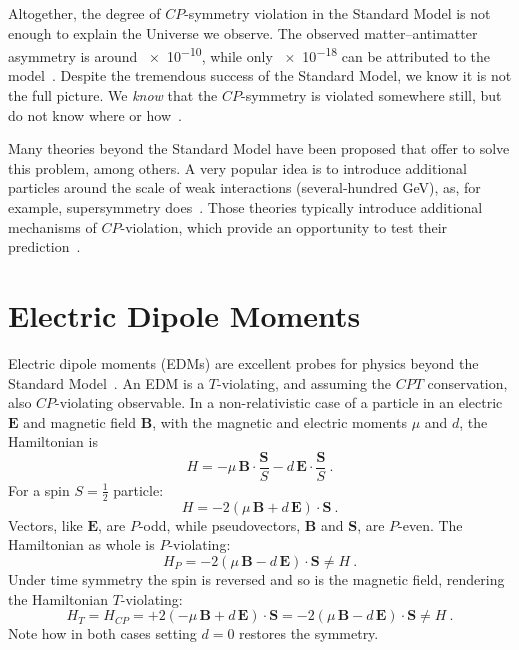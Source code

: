 Altogether, the degree of $CP$-symmetry violation in the Standard Model is not enough to explain the Universe we observe. The observed matter--antimatter asymmetry is around \num{e-10}, while only \num{e-18} can be attributed to the model~\cite{Riotto1999}. Despite the tremendous success of the Standard Model, we know it is not the full picture. We \emph{know} that the $CP$-symmetry is violated somewhere still, but do not know where or how~\cite{Pospelov2005}.%

Many theories beyond the Standard Model have been proposed that offer to solve this problem, among others. A very popular idea is to introduce additional particles around the scale of weak interactions (several-hundred GeV), as, for example, supersymmetry does~\cite{Supersymmetry}. Those theories typically introduce additional mechanisms of $CP$-violation, which provide an opportunity to test their prediction~\cite{Ellis1989}.



\section{Electric Dipole Moments}
Electric dipole moments (EDMs) are excellent probes for physics beyond the Standard Model~\cite{Pospelov2005}. An EDM is a $T$-violating, and assuming the $CPT$ conservation, also $CP$-violating observable. In a non-relativistic case of a particle in an electric $\mathbf{E}$ and magnetic field $\mathbf{B}$, with the magnetic and electric moments $\mu$ and $d$, the Hamiltonian is
\begin{equation}
  H = - \mu \, \mathbf{B} \cdot \frac{\mathbf{S}}{S} - d \, \mathbf{E} \cdot \frac{\mathbf{S}}{S} \ .
\end{equation}
For a spin $S = \tfrac{1}{2}$ particle:
\begin{equation}
  H = - 2 \left( \mu \, \mathbf{B} + d \, \mathbf{E} \right ) \cdot \mathbf{S} \ .
\end{equation}
Vectors, like $\mathbf{E}$, are $P$-odd, while pseudovectors, $\mathbf{B}$ and $\mathbf{S}$, are $P$-even. The Hamiltonian as whole is $P$-violating:
\begin{equation}
  H_P = - 2 \left( \mu \, \mathbf{B} - d \, \mathbf{E} \right ) \cdot \mathbf{S} \neq H \ .
\end{equation}
Under time symmetry the spin is reversed and so is the magnetic field, rendering the Hamiltonian $T$-violating:
\begin{equation}
  H_T = H_{CP} = + 2 \left( - \mu \, \mathbf{B} + d \, \mathbf{E} \right ) \cdot \mathbf{S} = - 2 \left( \mu \, \mathbf{B} - d \, \mathbf{E} \right ) \cdot \mathbf{S} \neq H \ .
\end{equation}
Note how in both cases setting $d = 0$ restores the symmetry.

